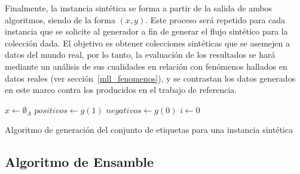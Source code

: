 Finalmente, la instancia sintética se forma a partir de la salida de ambos
algoritmos, siendo de la forma $(x, y)$. Este proceso será repetido para cada
instancia que se solicite al generador a fin de generar el flujo sintético para
la colección dada. El objetivo es obtener colecciones sintéticas que se asemejen
a datos del mundo real, por lo tanto, la evaluación de los resultados se hará
mediante un análisis de sus cualidades en relación con fenómenos hallados en
datos reales (ver sección~\ref{mll_fenomenos}), y se contrastan los datos
generados en este marco contra los producidos en el trabajo de referencia.

\begin{center}
	\begin{algorithm}[H]
		\label{alg:generar_atributos}
		\SetAlgoLined
		\DontPrintSemicolon
		$x \gets \emptyset_{A}$\;
		$positivos \gets g(1)$ \;
		$negativos \gets g(0)$ \;
		$i \gets 0$ \;
		\caption{Algoritmo de generación del conjunto de etiquetas para una instancia
			sintética}
	\end{algorithm}
\end{center}

\subsection{Algoritmo de Ensamble}
